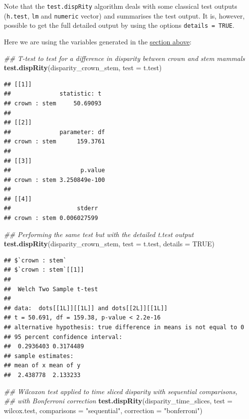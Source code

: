 \documentclass[]{book}
\newenvironment{Shaded}{\begin{snugshade}}{\end{snugshade}}
\newcommand{\CommentTok}[1]{\textcolor[rgb]{0.56,0.35,0.01}{\textit{#1}}}
\newcommand{\DataTypeTok}[1]{\textcolor[rgb]{0.13,0.29,0.53}{#1}}
\newcommand{\KeywordTok}[1]{\textcolor[rgb]{0.13,0.29,0.53}{\textbf{#1}}}
\newcommand{\NormalTok}[1]{#1}
\newcommand{\OtherTok}[1]{\textcolor[rgb]{0.56,0.35,0.01}{#1}}
\newcommand{\StringTok}[1]{\textcolor[rgb]{0.31,0.60,0.02}{#1}}
\begin{document}
Note that the \texttt{test.dispRity} algorithm deals with some classical test outputs (\texttt{h.test}, \texttt{lm} and \texttt{numeric} vector) and summarises the test output.
It is, however, possible to get the full detailed output by using the options \texttt{details\ =\ TRUE}.

Here we are using the variables generated in the \protect\hyperlink{summarising-dispRity-data-plots}{section above}:

\begin{Shaded}
\begin{Highlighting}[]
\CommentTok{## T-test to test for a difference in disparity between crown and stem mammals}
\KeywordTok{test.dispRity}\NormalTok{(disparity_crown_stem, }\DataTypeTok{test =}\NormalTok{ t.test)}
\end{Highlighting}
\end{Shaded}

\begin{verbatim}
## [[1]]
##              statistic: t
## crown : stem     50.69093
## 
## [[2]]
##              parameter: df
## crown : stem      159.3761
## 
## [[3]]
##                    p.value
## crown : stem 3.250849e-100
## 
## [[4]]
##                   stderr
## crown : stem 0.006027599
\end{verbatim}

\begin{Shaded}
\begin{Highlighting}[]
\CommentTok{## Performing the same test but with the detailed t.test output}
\KeywordTok{test.dispRity}\NormalTok{(disparity_crown_stem, }\DataTypeTok{test =}\NormalTok{ t.test, }\DataTypeTok{details =} \OtherTok{TRUE}\NormalTok{)}
\end{Highlighting}
\end{Shaded}

\begin{verbatim}
## $`crown : stem`
## $`crown : stem`[[1]]
## 
##  Welch Two Sample t-test
## 
## data:  dots[[1L]][[1L]] and dots[[2L]][[1L]]
## t = 50.691, df = 159.38, p-value < 2.2e-16
## alternative hypothesis: true difference in means is not equal to 0
## 95 percent confidence interval:
##  0.2936403 0.3174489
## sample estimates:
## mean of x mean of y 
##  2.438778  2.133233
\end{verbatim}

\begin{Shaded}
\begin{Highlighting}[]
\CommentTok{## Wilcoxon test applied to time sliced disparity with sequential comparisons,}
\CommentTok{## with Bonferroni correction}
\KeywordTok{test.dispRity}\NormalTok{(disparity_time_slices, }\DataTypeTok{test =}\NormalTok{ wilcox.test,}
              \DataTypeTok{comparisons =} \StringTok{"sequential"}\NormalTok{, }\DataTypeTok{correction =} \StringTok{"bonferroni"}\NormalTok{)}
\end{Highlighting}
\end{Shaded}
\end{document}
